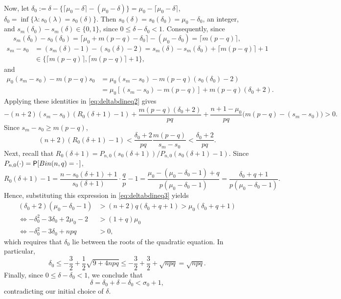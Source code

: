 \documentclass[11pt]{article}
\begin{document}
\begin{pf}
\begin{align}
\end{align}
Now, let
$\delta_0 :=
\delta - \{\lceil \mu_0 - \delta \rceil - (\mu_0 - \delta)\} =
\mu_0 - \lceil \mu_0 - \delta \rceil$, \ie
$\delta_0 = \inf\{ \lambda : s_0(\lambda) = s_0(\delta)\}$.
Then $s_0(\delta) = s_0(\delta_0) = \mu_0 - \delta_0$, an integer, and
$s_m(\delta_0) - s_m(\delta) \in\{0, 1\}$, since
$0 \leq \delta-\delta_0 < 1$.
Consequently,
since
\[ s_m(\delta_0) - s_0(\delta_0) = \lceil \mu_0  + m(p-q) - \delta_0 \rceil -
(\mu_0 - \delta_0) = \lceil m(p-q) \rceil, \]
\begin{align*}
s_m - s_0 &= (s_m(\delta) - 1) - (s_0(\delta) - 2) =
s_m(\delta) - s_m(\delta_0) + \lceil m(p-q) \rceil + 1 \\
 &\in \big\{\lceil m(p-q) \rceil, \lceil m(p-q) \rceil + 1 \big\},
\end{align*}
and
\begin{align*}
\mu_0(s_m - s_0) - m(p-q) s_0 & = \mu_0(s_m-s_0) - m(p-q)(s_0(\delta_0) - 2) \\
 &= \mu_0[(s_m-s_0) - m(p-q)] + m(p-q)(\delta_0 + 2).
\end{align*}
Applying these identities in \eqref{eq:deltabdineq2} gives
\[ 
-(n+2)(s_m - s_0)(R_0(\delta + 1) - 1) +
\frac{m(p-q)(\delta_0 + 2)}{pq}
+ \frac{n+1-\mu_0}{pq}\big(m(p-q) - (s_m-s_0)\big) > 0.
\]
Since $s_m-s_0 \geq m(p-q)$,
\begin{equation}\label{eq:deltabdineq3}
(n+2)(R_0(\delta+1) - 1) <
\frac{\delta_0 + 2}{pq}\frac{m(p-q)}{s_m - s_0} < \frac{\delta_0 + 2}{pq}.
\end{equation}
Next, recall that
$R_0(\delta+1) = P_{n,0}(s_0(\delta+1)) / P_{n,0}(s_0(\delta+1) - 1)$.
Since $P_{n,0}(\cdot) = \P[Bin(n,q) = \cdot\,]$, 
\[ R_0(\delta+1) - 1 =
\frac{n - s_0(\delta+1) + 1}{s_0(\delta+1)}\cdot \frac{q}{p} - 1 =
\frac{\mu_0 - (\mu_0 - \delta_0 - 1) + q}{p(\mu_0 - \delta_0 - 1)} =
\frac{\delta_0 + q + 1}{p(\mu_0 - \delta_0 - 1)}.
\]
Hence, substituting this expression in \eqref{eq:deltabdineq3} yields
\begin{align*}
(\delta_0 + 2)(\mu_0 - \delta_0 - 1) &> (n+2)q(\delta_0 + q + 1) >
\mu_0(\delta_0 + q + 1) \\
\iff
-\delta_0^2 - 3\delta_0 + 2\mu_0 - 2 &>  (1+q)\mu_0 \\
\iff
-\delta_0^2 - 3\delta_0 + npq &> 0,
\end{align*}
which requires that $\delta_0$ lie between the roots of the quadratic equation.
In particular,
\[ \delta_0 \leq -\frac{3}{2} + \frac{1}{2}\sqrt{9 + 4npq} \leq
-\frac{3}{2} + \frac{3}{2} + \sqrt{npq} = \sqrt{npq}. \]
Finally, since $0 \leq \delta-\delta_0 < 1$, we conclude that
\[ \delta = \delta_0 + \delta - \delta_0 < \sigma_0 + 1, \]
contradicting our initial choice of $\delta$.
\end{pf}
\end{document}
